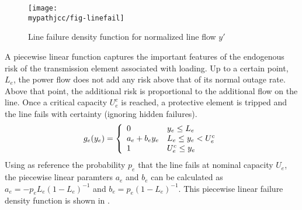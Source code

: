 \begin{figure}
 \centering                    
   \texttt{[image: \\mypathjcc/fig-linefail]}   
   \caption{Line failure density function for normalized line flow $y'$} \label{fig:linefaildensity}
\end{figure}


A piecewise linear function captures the important features of the endogenous risk of the transmission element associated with loading.  Up to a certain point, $L_e$, the power flow does not add any risk above that of its normal outage rate.  Above that point, the additional risk is proportional to the additional flow on the line.  Once a critical capacity $U_e^c$ is reached, a protective element is tripped and the line fails with certainty (ignoring hidden failures).  
\begin{equation}\label{pwl_risk}
g_e(y_e) = \left\{ \begin{array}{l l}
  0 & y_e \leq L_e \\
  a_e + b_e y_e & L_e \leq y_e < U_e^c \\
  1 & U_e^c \leq y_e 
\end{array}
\right.
\end{equation}
Using as reference the probability $p_e$ that the line fails at nominal capacity $U_e$, the piecewise linear paramters $a_e$ and $b_e$ can be calculated as $a_e = -p_eL_e (1-L_e)^{-1}$ and  $b_e = p_e(1-L_e)^{-1}$.  This piecewise linear failure density function is shown in .








